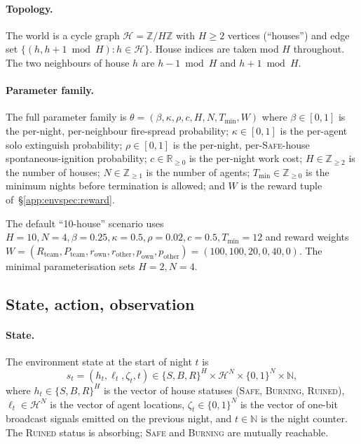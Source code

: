 \documentclass{anvil-paper}
\begin{document}
\paragraph{Topology.} The world is a cycle graph
$\mathcal{H}=\mathbb{Z}/H\mathbb{Z}$ with $H\geq 2$ vertices (``houses'')
and edge set $\{(h,h{+}1\bmod H):h\in\mathcal{H}\}$. House indices are
taken mod $H$ throughout. The two neighbours of house $h$ are
$h{-}1\bmod H$ and $h{+}1\bmod H$.

\paragraph{Parameter family.} The full parameter family is
$\theta=(\beta,\kappa,\rho,c,H,N,T_{\min},W)$ where $\beta\in[0,1]$ is the
per-night, per-neighbour fire-spread probability; $\kappa\in[0,1]$ is the
per-agent solo extinguish probability; $\rho\in[0,1]$ is the per-night,
per-\textsc{Safe}-house spontaneous-ignition probability; $c\in\mathbb{R}_{\geq 0}$
is the per-night work cost; $H\in\mathbb{Z}_{\geq 2}$ is the number of
houses; $N\in\mathbb{Z}_{\geq 1}$ is the number of agents;
$T_{\min}\in\mathbb{Z}_{\geq 0}$ is the minimum nights before termination
is allowed; and $W$ is the reward tuple of~\S\ref{app:envspec:reward}.

The default ``10-house'' scenario uses $H{=}10,N{=}4,\beta{=}0.25,
\kappa{=}0.5,\rho{=}0.02,c{=}0.5,T_{\min}{=}12$ and reward weights
$W=(R_{\text{team}},P_{\text{team}},r_{\text{own}},r_{\text{other}},
p_{\text{own}},p_{\text{other}})=(100,100,20,0,40,0)$. The minimal
parameterisation sets $H{=}2,N{=}4$.

\subsection{State, action, observation}
\label{app:envspec:soa}

\paragraph{State.} The environment state at the start of night $t$ is
\[
  s_t = (h_t,\ell_t,\zeta_t,t)\in\{S,B,R\}^H\times
        \mathcal{H}^N\times\{0,1\}^N\times\mathbb{N},
\]
where $h_t\in\{S,B,R\}^H$ is the vector of house statuses (\textsc{Safe},
\textsc{Burning}, \textsc{Ruined}), $\ell_t\in\mathcal{H}^N$ is the
vector of agent locations, $\zeta_t\in\{0,1\}^N$ is the vector of one-bit
broadcast signals emitted on the previous night, and $t\in\mathbb{N}$ is
the night counter. The \textsc{Ruined} status is absorbing; \textsc{Safe}
and \textsc{Burning} are mutually reachable.
\end{document}

